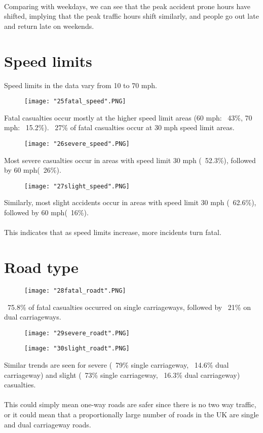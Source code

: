 \documentclass[a4paper, 12pt]{article}
\begin{document}
\paragraph{} Comparing with weekdays, we can see that the peak accident prone hours have shifted, implying that the peak traffic hours shift similarly, and people go out late and return late on weekends.
\vfill
\clearpage
\section{Speed limits}
Speed limits in the data vary from 10 to 70 mph.
\begin{figure}[!h]
\texttt{[image: "25fatal\_speed".PNG]}
\end{figure}
Fatal casualties occur mostly at the higher speed limit areas (60 mph: ~43\%, 70 mph: ~15.2\%). ~27\% of fatal casualties occur at 30 mph speed limit areas.
\begin{figure}[!h]
\texttt{[image: "26severe\_speed".PNG]}
\end{figure}
Most severe casualties occur in areas with speed limit 30 mph (~52.3\%), followed by 60 mph(~26\%).
\begin{figure}[!h]
\texttt{[image: "27slight\_speed".PNG]}
\end{figure}
Similarly, most slight accidents occur in areas with speed limit 30 mph (~62.6\%), followed by 60 mph(~16\%).
\paragraph{} This indicates that as speed limits increase, more incidents turn fatal.
\section{Road type}
\begin{figure}[!hb]
\texttt{[image: "28fatal\_roadt".PNG]}
\end{figure}
~75.8\% of fatal casualties occurred on single carriageways, followed by ~21\% on dual carriageways.
\begin{figure}[!h]
\texttt{[image: "29severe\_roadt".PNG]}
\end{figure}
\begin{figure}[!h]
\texttt{[image: "30slight\_roadt".PNG]}
\end{figure}
Similar trends are seen for severe (~79\% single carriageway, ~14.6\% dual carriageway) and slight (~73\% single carriageway, ~16.3\% dual carriageway) casualties.
\paragraph{} This could simply mean one-way roads are safer since there is no two way traffic, or it could mean that a proportionally large number of roads in the UK are single and dual carriageway roads.
\end{document}
